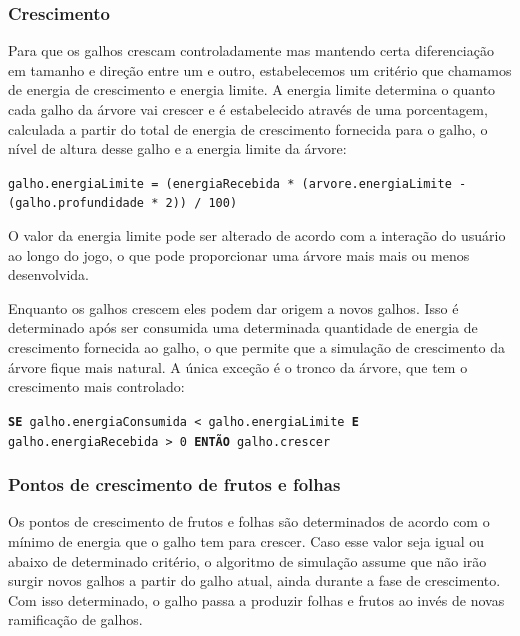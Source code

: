 \documentclass[12pt]{article}
\begin{document}
\subsubsection{Crescimento}
Para que os galhos crescam controladamente mas mantendo certa diferencia\c c\~ao em tamanho e
dire\c c\~ao entre um e outro, estabelecemos um crit\'erio que chamamos de energia de crescimento e energia limite.
A energia limite determina o quanto cada  galho da \'arvore vai crescer e \'e estabelecido atrav\'es de uma porcentagem,
calculada a partir do total de energia de crescimento fornecida para o galho, o n\'ivel de altura desse galho e a energia
limite da \'arvore:

  \texttt{\footnotesize{galho.energiaLimite = (energiaRecebida * (arvore.energiaLimite - (galho.profundidade * 2)) / 100)}}

O valor da energia limite pode
ser alterado de acordo com a intera\c c\~ao do usu\'ario ao longo do jogo, o que pode proporcionar uma \'arvore mais
mais ou menos desenvolvida.

Enquanto os galhos crescem eles podem dar origem a novos galhos. Isso \'e determinado ap\'os ser consumida uma determinada
quantidade de energia de crescimento fornecida ao galho, o que permite que a simula\c c\~ao de crescimento da \'arvore
fique mais natural. A \'unica exce\c c\~ao \'e o tronco da \'arvore, que tem o crescimento
mais controlado:

\texttt{\footnotesize{\textbf{SE} galho.energiaConsumida < galho.energiaLimite \textbf{E} galho.energiaRecebida > 0
\textbf{ENT\~AO} galho.crescer}}

\subsubsection{Pontos de crescimento de frutos e folhas}
Os pontos de crescimento de frutos e folhas s\~ao determinados de acordo com o m\'inimo de energia que o galho
tem para crescer. Caso esse valor seja igual ou abaixo de determinado crit\'erio, o algoritmo de simula\c c\~ao assume
que n\~ao ir\~ao surgir novos galhos a partir do galho atual, ainda durante a fase de crescimento. Com isso determinado,
o galho passa a produzir folhas e frutos ao inv\'es de novas ramifica\c c\~ao de galhos.
\end{document}
